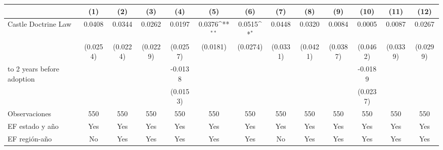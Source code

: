 {
\def\sym#1{\ifmmode^{#1}\else\(^{#1}\)\fi}
\begin{tabular}{l*{12}{c}}
\toprule
                    &\multicolumn{1}{c}{(1)}         &\multicolumn{1}{c}{(2)}         &\multicolumn{1}{c}{(3)}         &\multicolumn{1}{c}{(4)}         &\multicolumn{1}{c}{(5)}         &\multicolumn{1}{c}{(6)}         &\multicolumn{1}{c}{(7)}         &\multicolumn{1}{c}{(8)}         &\multicolumn{1}{c}{(9)}         &\multicolumn{1}{c}{(10)}         &\multicolumn{1}{c}{(11)}         &\multicolumn{1}{c}{(12)}         \\
\midrule
Castle Doctrine Law &      0.0408         &      0.0344         &      0.0262         &      0.0197         &      0.0376\sym{**} &      0.0515\sym{*}  &      0.0448         &      0.0320         &      0.0084         &      0.0005         &      0.0087         &      0.0267         \\
                    &    (0.0254)         &    (0.0224)         &    (0.0229)         &    (0.0257)         &    (0.0181)         &    (0.0274)         &    (0.0331)         &    (0.0421)         &    (0.0387)         &    (0.0462)         &    (0.0339)         &    (0.0299)         \\
\addlinespace
0 to 2 years before adoption&                     &                     &                     &     -0.0138         &                     &                     &                     &                     &                     &     -0.0189         &                     &                     \\
                    &                     &                     &                     &    (0.0153)         &                     &                     &                     &                     &                     &    (0.0237)         &                     &                     \\
\midrule
Observaciones       &         550         &         550         &         550         &         550         &         550         &         550         &         550         &         550         &         550         &         550         &         550         &         550         \\
EF estado y año     &         Yes         &         Yes         &         Yes         &         Yes         &         Yes         &         Yes         &         Yes         &         Yes         &         Yes         &         Yes         &         Yes         &         Yes         \\
EF región-año       &          No         &         Yes         &         Yes         &         Yes         &         Yes         &         Yes         &          No         &         Yes         &         Yes         &         Yes         &         Yes         &         Yes         \\

\end{tabular}}
